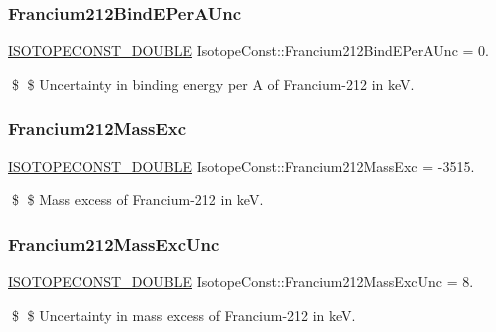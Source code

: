\subsubsection{\texorpdfstring{Francium212\+Bind\+E\+Per\+A\+Unc}{Francium212BindEPerAUnc}}
{\footnotesize\ttfamily \mbox{\hyperlink{group___isotope_const-_macros_ga8f45a7272ce02c0b4c65c44636ed719a}{I\+S\+O\+T\+O\+P\+E\+C\+O\+N\+S\+T\+\_\+\+D\+O\+U\+B\+LE}} Isotope\+Const\+::\+Francium212\+Bind\+E\+Per\+A\+Unc = 0.}

\$ \$ Uncertainty in binding energy per A of Francium-\/212 in keV. \mbox{\label{group___isotope_const-_francium-_fr212_ga1557175c6ee512a4e5bff0448c81dc8a}} 
\subsubsection{\texorpdfstring{Francium212\+Mass\+Exc}{Francium212MassExc}}
{\footnotesize\ttfamily \mbox{\hyperlink{group___isotope_const-_macros_ga8f45a7272ce02c0b4c65c44636ed719a}{I\+S\+O\+T\+O\+P\+E\+C\+O\+N\+S\+T\+\_\+\+D\+O\+U\+B\+LE}} Isotope\+Const\+::\+Francium212\+Mass\+Exc = -\/3515.}

\$ \$ Mass excess of Francium-\/212 in keV. \mbox{\label{group___isotope_const-_francium-_fr212_gadaca974267dd3847c52b96cb17ce1cc7}} 
\subsubsection{\texorpdfstring{Francium212\+Mass\+Exc\+Unc}{Francium212MassExcUnc}}
{\footnotesize\ttfamily \mbox{\hyperlink{group___isotope_const-_macros_ga8f45a7272ce02c0b4c65c44636ed719a}{I\+S\+O\+T\+O\+P\+E\+C\+O\+N\+S\+T\+\_\+\+D\+O\+U\+B\+LE}} Isotope\+Const\+::\+Francium212\+Mass\+Exc\+Unc = 8.}

\$ \$ Uncertainty in mass excess of Francium-\/212 in keV. \mbox{\label{group___isotope_const-_francium-_fr212_ga85841c49ffc0382fd9d0167c0ef9e8fc}} 
